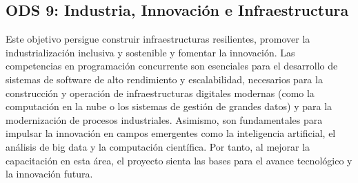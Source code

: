 \subsection*{ODS 9: Industria, Innovación e Infraestructura \cite{ods_9}}
Este objetivo persigue construir infraestructuras resilientes, promover la industrialización inclusiva y sostenible y fomentar la innovación. Las competencias en programación concurrente son esenciales para el desarrollo de sistemas de software de alto rendimiento y escalabilidad, necesarios para la construcción y operación de infraestructuras digitales modernas (como la computación en la nube o los sistemas de gestión de grandes datos) y para la modernización de procesos industriales. Asimismo, son fundamentales para impulsar la innovación en campos emergentes como la inteligencia artificial, el análisis de big data y la computación científica. Por tanto, al mejorar la capacitación en esta área, el proyecto sienta las bases para el avance tecnológico y la innovación futura.
